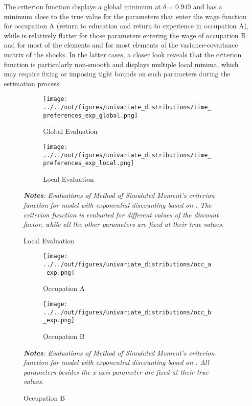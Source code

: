 The criterion function displays a global minimum at $\delta = 0.949$ and has a minimum close to the true value for the parameters that enter the wage function for occupation A (return to education and return to experience in occupation A), while is relatively flatter for those parameters entering the wage of occupation B and for most of the elements and for most elements of the variance-covariance matrix of the shocks. In the latter cases, a closer look reveals that the criterion function is particularly non-smooth and displays multiple local minima, which may require fixing or imposing tight bounds on such parameters during the estimation process.

\begin{figure} 
\centering
\captionsetup{justification=centering}
\caption{Univariate Distribution of Discount Factor,\newline Model with Exponential Discounting}
\label{fig:univariate-exp-main}
\begin{subfigure}{0.5\textwidth}
\caption{Global Evaluation}
\texttt{[image: ../../out/figures/univariate\_distributions/time\_preferences\_exp\_global.png]}
\end{subfigure}%
\begin{subfigure}{0.5\textwidth}
\caption{Local Evaluation}
\texttt{[image: ../../out/figures/univariate\_distributions/time\_preferences\_exp\_local.png]}
\end{subfigure}

\bigskip
\footnotesize
\raggedright
\textit{\textbf{Notes}: Evaluations of Method of Simulated Moment's criterion function for model with exponential discounting based on \textcite{KeaneWolpin1994}. The criterion function is evaluated for different values of the discount factor, while all the other parameters are fixed at their true values.}
\end{figure}

\begin{figure}
\centering
\captionsetup{justification=centering}
\caption{Univariate Distribution of Wage Parameters,\newline Model with Exponential Discounting}
\label{fig:univariate-exp-others}
\begin{subfigure}{\textwidth}
\caption{Occupation A}
\texttt{[image: ../../out/figures/univariate\_distributions/occ\_a\_exp.png]}
\end{subfigure}
\begin{subfigure}{\textwidth}
\caption{Occupation B}
\texttt{[image: ../../out/figures/univariate\_distributions/occ\_b\_exp.png]}
\end{subfigure}

\bigskip
\footnotesize
\raggedright
\textit{\textbf{Notes}: Evaluations of Method of Simulated Moment's criterion function for model with exponential discounting based on \textcite{KeaneWolpin1994}. All parameters besides the x-axis parameter are fixed at their true values.}
\end{figure}

